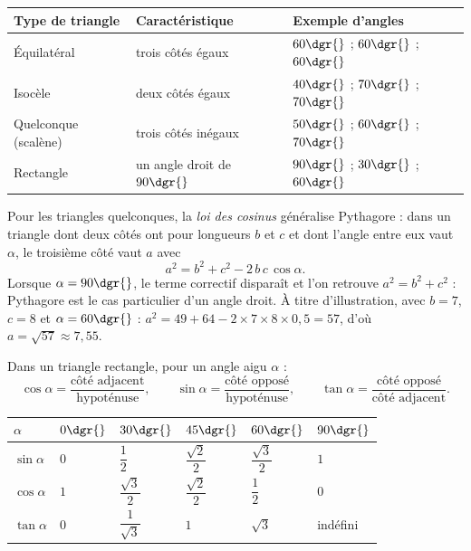 \begin{center}
\small
\begin{tabular}{L{3.2cm}L{6.0cm}L{5.4cm}}
\toprule
{}\textbf{Type de triangle} & \textbf{Caractéristique} & \textbf{Exemple d'angles}\\
\midrule
Équilatéral & trois côtés égaux & $60\dgr{}$ ; $60\dgr{}$ ; $60\dgr{}$\\
Isocèle & deux côtés égaux & $40\dgr{}$ ; $70\dgr{}$ ; $70\dgr{}$\\
Quelconque (scalène) & trois côtés inégaux & $50\dgr{}$ ; $60\dgr{}$ ; $70\dgr{}$\\
Rectangle & un angle droit de $90\dgr{}$ & $90\dgr{}$ ; $30\dgr{}$ ; $60\dgr{}$\\
\bottomrule
\end{tabular}
\label{ch5:tab:types}
\end{center}

Pour les triangles quelconques, la \emph{loi des cosinus} généralise Pythagore : dans un triangle dont deux côtés ont pour longueurs $b$ et $c$ et dont l'angle entre eux vaut $\alpha$, le troisième côté vaut $a$ avec
\[
a^{2} = b^{2} + c^{2} - 2\,b\,c\,\cos \alpha .
\]
Lorsque $\alpha = 90\dgr{}$, le terme correctif disparaît et l'on retrouve $a^{2} = b^{2} + c^{2}$ : Pythagore est le cas particulier d'un angle droit. À titre d'illustration, avec $b = 7$, $c = 8$ et $\alpha = 60\dgr{}$ : $a^{2} = 49 + 64 - 2 \times 7 \times 8 \times 0{,}5 = 57$, d'où $a = \sqrt{57} \approx 7{,}55$.

\begin{propriete}
Dans un triangle rectangle, pour un angle aigu $\alpha$ :
\[
\cos \alpha = \frac{\text{côté adjacent}}{\text{hypoténuse}}, \qquad
\sin \alpha = \frac{\text{côté opposé}}{\text{hypoténuse}}, \qquad
\tan \alpha = \frac{\text{côté opposé}}{\text{côté adjacent}} .
\]
\end{propriete}

\begin{center}
\small
\begin{tabular}{C{1.7cm}C{1.9cm}C{1.9cm}C{1.9cm}C{1.9cm}C{1.7cm}}
\toprule
{}$\alpha$ & $0\dgr{}$ & $30\dgr{}$ & $45\dgr{}$ & $60\dgr{}$ & $90\dgr{}$\\
\midrule
$\sin \alpha$ & $0$ & $\dfrac{1}{2}$ & $\dfrac{\sqrt{2}}{2}$ & $\dfrac{\sqrt{3}}{2}$ & $1$\\
$\cos \alpha$ & $1$ & $\dfrac{\sqrt{3}}{2}$ & $\dfrac{\sqrt{2}}{2}$ & $\dfrac{1}{2}$ & $0$\\
$\tan \alpha$ & $0$ & $\dfrac{1}{\sqrt{3}}$ & $1$ & $\sqrt{3}$ & indéfini\\
\bottomrule
\end{tabular}
\label{ch5:tab:trigo}
\end{center}

